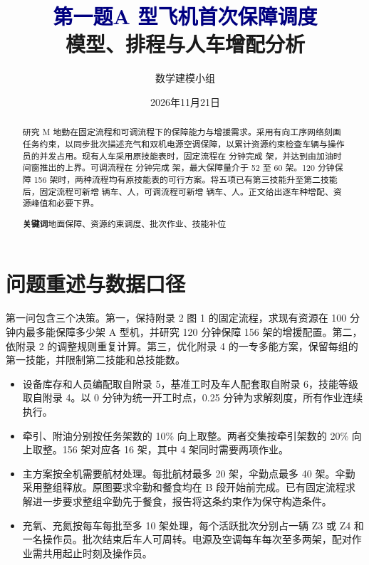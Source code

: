 \documentclass[UTF8,12pt,a4paper,fontset=none]{ctexart}
\title{\textcolor{navy}{第一题\quad A 型飞机首次保障调度}\\[6pt]
\large 模型、排程与人车增配分析}
\author{数学建模小组}
\date{2026年11月21日}
\newcommand{\keywords}[1]{\par\noindent\textbf{关键词}\quad #1}
\newcommand{\sectionpage}{\clearpage}
\begin{document}
\maketitle
\begin{abstract}
研究 M 地勤在固定流程和可调流程下的保障能力与增援需求。采用有向工序网络刻画任务约束，以同步批次描述充气和双机电源空调保障，以累计资源约束检查车辆与操作员的并发占用。现有人车采用原技能表时，固定流程在 \FixedShortLast 分钟完成 \FixedShortAircraft 架，并达到由加油时间窗推出的上界。可调流程在 \FlexShortLast 分钟完成 \FlexShortAircraft 架，最大保障量介于 52 至 60 架。120 分钟保障 156 架时，两种流程均有原技能表的可行方案。将五项已有第三技能升至第二技能后，固定流程可新增 \FixedLongCars 辆车、\FixedLongPeople 人，可调流程可新增 \FlexLongCars 辆车、\FlexLongPeople 人。正文给出逐车种增配、资源峰值和必要下界。
\keywords{地面保障、资源约束调度、批次作业、技能补位}
\end{abstract}

\section{问题重述与数据口径}
第一问包含三个决策。第一，保持附录 2 图 1 的固定流程，求现有资源在 100 分钟内最多能保障多少架 A 型机，并研究 120 分钟保障 156 架的增援配置。第二，依附录 2 的调整规则重复计算。第三，优化附录 4 的一专多能方案，保留每组的第一技能，并限制第二技能和总技能数。
\begin{itemize}
\item 设备库存和人员编配取自附录 5，基准工时及车人配套取自附录 6，技能等级取自附录 4。以 0 分钟为统一开工时点，0.25 分钟为求解刻度，所有作业连续执行。
\item 牵引、附油分别按任务架数的 10\% 向上取整。两者交集按牵引架数的 20\% 向上取整。156 架对应各 16 架，其中 4 架同时需要两项作业。
\item 主方案按全机需要航材处理。每批航材最多 20 架，伞勤点最多 40 架。伞勤采用整组释放。原图要求伞勤和餐食均在 B 段开始前完成。已有固定流程求解进一步要求整组伞勤先于餐食，报告将这条约束作为保守构造条件。
\item 充氧、充氮按每车每批至多 10 架处理，每个活跃批次分别占一辆 Z3 或 Z4 和一名操作员。批次结束后车人可周转。电源及空调每车每次至多两架，配对作业需共用起止时刻及操作员。
\end{itemize}

\sectionpage
\end{document}
